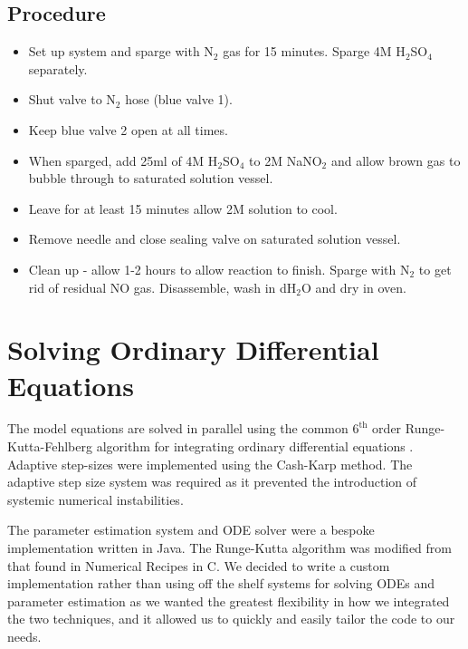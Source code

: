\subsection*{Procedure}
\begin{itemize}
 \item Set up system and sparge with N$_{\textrm{2}}$ gas for 15 minutes. Sparge 4M H$_{\textrm{2}}$SO$_{\textrm{4}}$ separately.
 \item Shut valve to N$_{\textrm{2}}$ hose (blue valve 1).
 \item Keep blue valve 2 open at all times.
 \item When sparged, add 25ml of 4M H$_{\textrm{2}}$SO$_{\textrm{4}}$ to 2M NaNO$_{\textrm{2}}$ and allow brown gas to bubble through to saturated solution vessel.
 \item Leave for at least 15 minutes allow 2M solution to cool.
 \item Remove needle and close sealing valve on saturated solution vessel.
 \item Clean up - allow 1-2 hours to allow reaction to finish. Sparge with N$_{\textrm{2}}$ to get rid of residual NO gas. Disassemble, wash in dH$_{\textrm{2}}$O and dry in oven.
\end{itemize}

\section{Solving Ordinary Differential Equations}
The model equations are solved in parallel using the common $\mathrm{6}^\mathrm{th}$ order Runge-Kutta-Fehlberg algorithm for integrating ordinary differential equations \cite{Butcher2003}. Adaptive step-sizes were implemented using the Cash-Karp method\cite{Cash1990}. The adaptive step size system was required as it prevented the introduction of systemic numerical instabilities.

The parameter estimation system and ODE solver were a bespoke implementation written in Java. The Runge-Kutta algorithm was modified from that found in Numerical Recipes in C\cite{Press1992}. We decided to write a custom implementation rather than using off the shelf systems for solving ODEs and parameter estimation as we wanted the greatest flexibility in how we integrated the two techniques, and it allowed us to quickly and easily tailor the code to our needs. %

